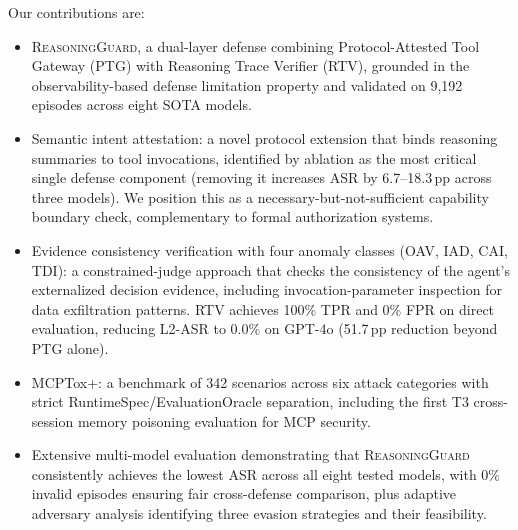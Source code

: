 Our contributions are:
\begin{itemize}
\item \textsc{ReasoningGuard}, a dual-layer defense combining Protocol-Attested Tool Gateway (PTG) with Reasoning Trace Verifier (RTV), grounded in the observability-based defense limitation property and validated on 9{,}192 episodes across eight SOTA models.
\item Semantic intent attestation: a novel protocol extension that binds reasoning summaries to tool invocations, identified by ablation as the most critical single defense component (removing it increases ASR by 6.7--18.3\,pp across three models). We position this as a necessary-but-not-sufficient capability boundary check, complementary to formal authorization systems.
\item Evidence consistency verification with four anomaly classes (OAV, IAD, CAI, TDI): a constrained-judge approach that checks the consistency of the agent's externalized decision evidence, including invocation-parameter inspection for data exfiltration patterns. RTV achieves 100\% TPR and 0\% FPR on direct evaluation, reducing L2-ASR to 0.0\% on GPT-4o (51.7\,pp reduction beyond PTG alone).
\item MCPTox+: a benchmark of 342 scenarios across six attack categories with strict RuntimeSpec/EvaluationOracle separation, including the first T3 cross-session memory poisoning evaluation for MCP security.
\item Extensive multi-model evaluation demonstrating that \textsc{ReasoningGuard} consistently achieves the lowest ASR across all eight tested models, with 0\% invalid episodes ensuring fair cross-defense comparison, plus adaptive adversary analysis identifying three evasion strategies and their feasibility.
\end{itemize}